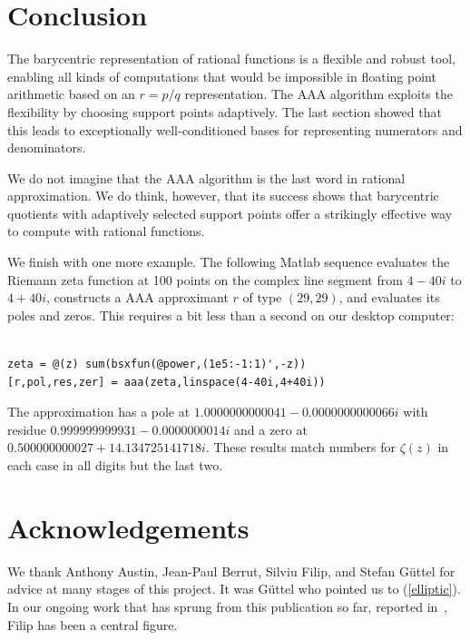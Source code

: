 \documentclass[final]{siamltex}
\begin{document}
\section{Conclusion}
The barycentric representation of rational functions is a flexible
and robust tool, enabling all kinds of computations that would be
impossible in floating point arithmetic based on an $r=p/q$
representation.  The AAA algorithm exploits the flexibility by
choosing support points adaptively.  The last section showed
that this leads to exceptionally well-conditioned bases for
representing numerators and denominators.

We do not imagine that the AAA algorithm is the last word in
rational approximation.  We do think, however, that its success shows
that barycentric quotients with adaptively selected
support points offer a strikingly effective way to compute with
rational functions.

We finish with one more example.  The following Matlab sequence
evaluates the Riemann zeta function at 100 points on the complex
line segment from $4-40i$ to $4+40i$, constructs a AAA approximant
$r$ of type $(29,29)$, and evaluates its poles and zeros.
This requires a bit less than a second on our desktop computer:

{\small
\begin{verbatim}

zeta = @(z) sum(bsxfun(@power,(1e5:-1:1)',-z))
[r,pol,res,zer] = aaa(zeta,linspace(4-40i,4+40i))

\end{verbatim}
\par}

\noindent 
The approximation has a pole at
$ 1.0000000000041 - 0.0000000000066i$ with residue
$0.999999999931 - 0.0000000014i$ and a zero at
$  0.500000000027 +14.134725141718i$.
These results match numbers for
$\zeta(z)$ in each case in all digits but the last two.

\section*{Acknowledgements}
We thank Anthony Austin, Jean-Paul Berrut,
Silviu Filip, and Stefan G\"uttel for
advice at many stages of this project.
It was G\"uttel who pointed us to (\ref{elliptic}).
In our ongoing work that has sprung from this publication so far,
reported in~\cite{fntb}, Filip has been a central figure.
\end{document}
